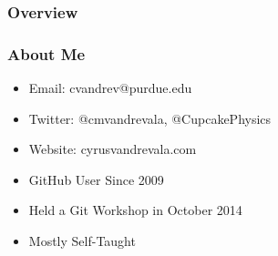 
\begin{frame}[plain]
\titlepage
\end{frame}
\note{}

\begin{frame}
\frametitle{\large{Overview}}
\tableofcontents
\end{frame}
\note{}

\begin{frame}
\frametitle{\large{About Me}}
\begin{itemize}
\item Email: cvandrev@purdue.edu
\item Twitter: @cmvandrevala, @CupcakePhysics
\item Website: cyrusvandrevala.com
\end{itemize}
\begin{itemize}
\item GitHub User Since 2009
\item Held a Git Workshop in October 2014
\item Mostly Self-Taught
\end{itemize}
\end{frame}
\note{}